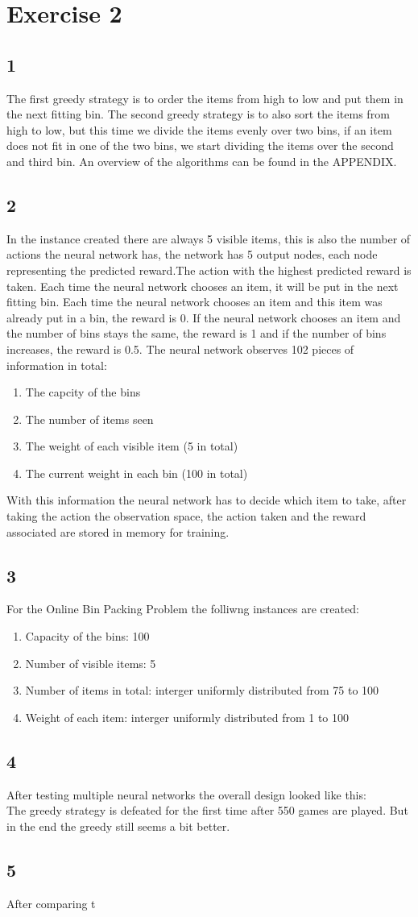 \section*{Exercise 2}
\subsection*{1}
The first greedy strategy is to order the items from high to low and put them in the next fitting bin. The second greedy strategy is to also sort the items from high to low, but this time we divide the items evenly over two bins, if an item does not fit in one of the two bins, we start dividing the items over the second and third bin. An overview of the algorithms can be found in the APPENDIX.
\subsection*{2}
In the instance created there are always 5 visible items, this is also the number of actions the neural network has, the network has 5 output nodes, each node representing the predicted reward.The action with the highest predicted reward is taken. Each time the neural network chooses an item, it will be put in the next fitting bin. Each time the neural network chooses an item and this item was already put in a bin, the reward is 0. If the neural network chooses an item and the number of bins stays the same, the reward is 1 and if the number of bins increases, the reward is 0.5. The neural network observes 102 pieces of information in total:
\begin{enumerate}
	\item The capcity of the bins
	\item The number of items seen
	\item The weight of each visible item (5 in total)
	\item The current weight in each bin (100 in total)
\end{enumerate}
With this information the neural network has to decide which item to take, after taking the action the observation space, the action taken and the reward associated are stored in memory for training. 
\subsection*{3}
For the Online Bin Packing Problem the folliwng instances are created:
\begin{enumerate}
	\item Capacity of the bins: 100
	\item Number of visible items: 5
	\item Number of items in total: interger uniformly distributed from 75 to 100
	\item Weight of each item: interger uniformly distributed from 1 to 100
\end{enumerate}
\subsection*{4}
After testing multiple neural networks the overall design looked like this:\\
The greedy strategy is defeated for the first time after 550 games are played. But in the end the greedy still seems a bit better.
\subsection*{5}
After comparing t
